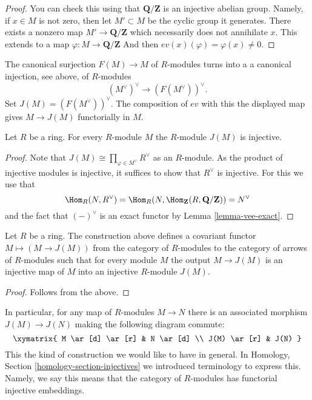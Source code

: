 \begin{proof}
You can check this using that $\mathbf{Q}/\mathbf{Z}$ is an injective
abelian group. Namely, if $x \in M$ is not zero, then let
$M' \subset M$ be the cyclic group it generates. There exists
a nonzero map $M' \to \mathbf{Q}/\mathbf{Z}$ which necessarily does
not annihilate $x$. This extends to
a map $\varphi : M \to \mathbf{Q}/\mathbf{Z}$
And then $ev(x)(\varphi) = \varphi(x) \not = 0$.
\end{proof}

\noindent
The canonical surjection $F(M) \to M$ of $R$-modules turns into a
a canonical injection, see above, of $R$-modules
$$
(M^\vee)^\vee \longrightarrow (F(M^\vee))^\vee.
$$
Set $J(M) = (F(M^\vee))^\vee$. The composition of $ev$ with this
the displayed map gives $M \to J(M)$ functorially in $M$.

\begin{lemma}
\label{lemma-JM-injective}
Let $R$ be a ring. For every $R$-module $M$ the
$R$-module $J(M)$ is injective.
\end{lemma}

\begin{proof}
Note that $J(M) \cong \prod_{\varphi \in M^\vee} R^\vee$ as an $R$-module.
As the product of injective modules is injective, it suffices to
show that $R^\vee$ is injective. For this we use that
$$
\Hom_R(N, R^\vee) =
\Hom_R(N, \Hom_{\mathbf{Z}}(R, \mathbf{Q}/\mathbf{Z})) =
N^\vee
$$
and the
fact that $(-)^\vee$ is an exact functor by Lemma
\ref{lemma-vee-exact}.
\end{proof}

\begin{lemma}
\label{lemma-injectives-modules}
Let $R$ be a ring.
The construction above defines a covariant functor
$M \mapsto (M \to J(M))$ from the category of
$R$-modules to the category of arrows of $R$-modules
such that for every module $M$ the output
$M \to J(M)$ is an injective map of $M$ into
an injective $R$-module $J(M)$.
\end{lemma}

\begin{proof}
Follows from the above.
\end{proof}

\noindent
In particular, for any map of $R$-modules $M \to N$
there is an associated morphism $J(M) \to J(N)$
making the following diagram commute:
$$
\xymatrix{
M \ar[d] \ar[r] & N \ar[d] \\
J(M) \ar[r] & J(N) }
$$
This the kind of construction we would like to have in general.
In Homology, Section \ref{homology-section-injectives}
we introduced terminology to express this. Namely,
we say this means that the category of $R$-modules
has functorial injective embeddings.











